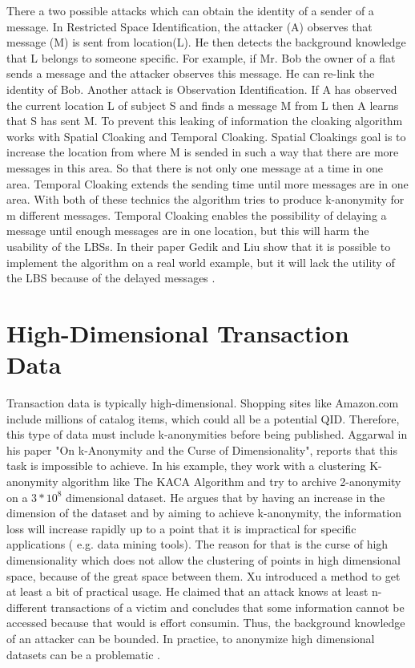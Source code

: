 \documentclass{llncs}
\begin{document}
There a two possible attacks which can obtain  the identity of a sender of a message. In  Restricted Space Identification, the attacker (A) observes that message (M) is sent from location(L). He then detects the background knowledge that L belongs to someone specific. For example, if Mr. Bob the owner of a flat sends a message and the attacker observes this message. He can re-link the identity of Bob. Another attack is  Observation Identiﬁcation. If A has observed the current location L of subject S and ﬁnds a message M from L then A learns that S has sent M. To prevent this leaking of information the cloaking algorithm works with Spatial Cloaking and Temporal Cloaking. Spatial Cloakings goal is to increase the location from where M is sended in such a way that there are more messages in this area. So that there is not only one message at a time in one area. Temporal Cloaking extends the sending time until more messages are in one area. With both of these technics the algorithm tries to produce k-anonymity for m different messages. Temporal Cloaking enables the possibility of delaying a message until enough messages are in one location, but this will harm the usability of the LBSs. In their paper Gedik and Liu show that it is possible to implement the algorithm on a real world example, but it will lack the utility of the LBS because of the delayed messages \cite{gedik2004customizable}.

\section{High-Dimensional Transaction Data}
Transaction data is typically high-dimensional. Shopping sites like Amazon.com include millions of catalog items, which could all be a potential QID. Therefore, this type of data must include k-anonymities before being published\cite{wang2010privacy}. Aggarwal in his paper "On k-Anonymity and the Curse of Dimensionality", reports that this task is impossible to achieve. In his example, they work with a clustering K-anonymity algorithm like The KACA Algorithm and try to archive 2-anonymity on a $3*10^8$ dimensional dataset. He argues that by having an increase in the dimension of the dataset and by aiming to achieve k-anonymity, the information loss will increase rapidly up to a point that it is impractical for specific applications ( e.g. data mining tools).  The reason for that is the curse of high dimensionality which does not allow the clustering of points in high dimensional space, because of the great space between them. Xu introduced a method to get at least a bit of practical usage. He claimed that an attack knows at least n-different transactions of a victim and concludes that some information cannot be accessed because that would is effort consumin\cite{xu2008publishing}. Thus, the background knowledge of an attacker can be bounded. In practice, to anonymize high dimensional datasets can be a problematic \cite{aggarwal2005k}.
\end{document}
